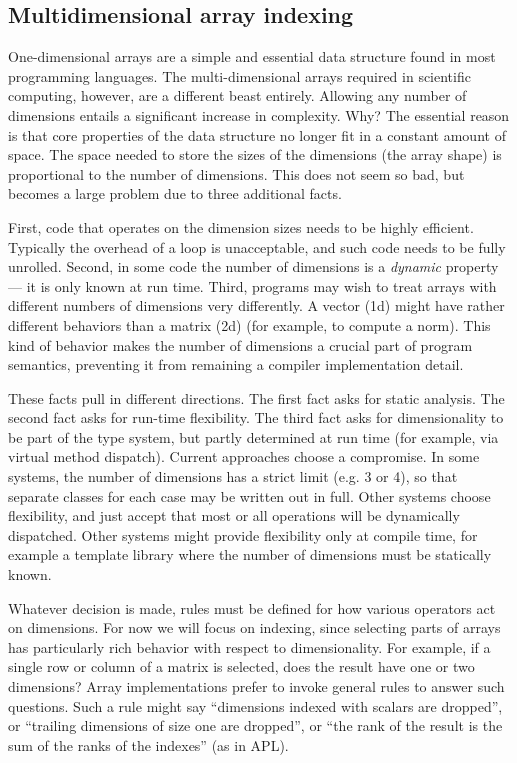 \subsection{Multidimensional array indexing}

One-dimensional arrays are a simple and essential data structure found in
most programming languages. The multi-dimensional arrays required in
scientific computing, however, are a different beast entirely. Allowing
any number of dimensions entails a significant increase in complexity. Why?
The essential reason is that core properties of the data structure no
longer fit in a constant amount of space. The space needed to store the
sizes of the dimensions (the array shape) is proportional to the number
of dimensions. This does not seem so bad, but becomes a large problem
due to three additional facts.

First, code that operates on the dimension
sizes needs to be highly efficient. Typically the overhead of a loop is
unacceptable, and such code needs to be fully unrolled. Second, in some
code the number of dimensions is a \emph{dynamic} property --- it is
only known at run time. Third, programs may wish to treat arrays with
different numbers of dimensions very differently. A vector (1d) might
have rather different behaviors than a matrix (2d) (for example, to
compute a norm). This kind of
behavior makes the number of dimensions a crucial part of program
semantics, preventing it from remaining a compiler implementation detail.

These facts pull in different directions. The first fact asks for static
analysis. The second fact asks for run-time flexibility. The third fact asks
for dimensionality to be part of the type system, but partly determined
at run time (for example, via virtual method dispatch). Current approaches
choose a compromise. In some systems, the number of dimensions has a strict
limit (e.g. 3 or 4), so that separate classes for each case may be written
out in full. Other systems choose flexibility, and just accept that most
or all operations will be dynamically dispatched. Other systems might
provide flexibility only at compile time, for example a template library
where the number of dimensions must be statically known.



Whatever decision is made, rules must be defined for how various operators
act on dimensions. For now we will focus on indexing, since selecting
parts of arrays has particularly rich behavior with respect to
dimensionality. For example, if a single row or column of a matrix is
selected, does the result have one or two dimensions? Array implementations
prefer to invoke general rules to answer such questions. Such a rule might
say ``dimensions indexed with scalars are dropped'', or ``trailing
dimensions of size one are dropped'', or ``the rank of the result
is the sum of the ranks of the indexes'' (as in APL).


